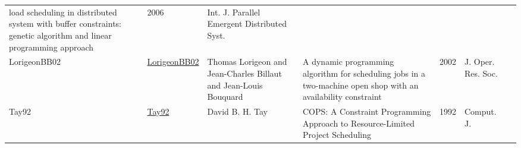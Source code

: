 {\begin{longtable}{llp{5cm}p{10cm}rp{3cm}l}
load scheduling in distributed system with buffer constraints: genetic algorithm and linear programming approach & 2006 & Int. J. Parallel Emergent Distributed Syst. & \cite{SureshMOK06}\\LorigeonBB02 & \href{https://doi.org/10.1057/palgrave.jors.2601421}{LorigeonBB02} & Thomas Lorigeon and Jean{-}Charles Billaut and Jean{-}Louis Bouquard & A dynamic programming algorithm for scheduling jobs in a two-machine open shop with an availability constraint & 2002 & J. Oper. Res. Soc. & \cite{LorigeonBB02}\\Tay92 & \href{}{Tay92} & David B. H. Tay & {COPS:} {A} Constraint Programming Approach to Resource-Limited Project Scheduling & 1992 & Comput. J. & \cite{Tay92}\\\end{longtable}
}

